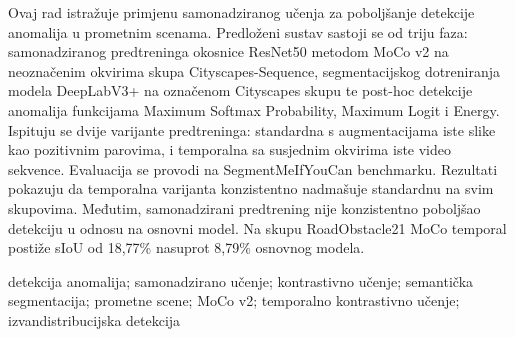 \documentclass[diplomskirad]{fer}
\begin{document}






\begin{sazetak}
	Ovaj rad istražuje primjenu samonadziranog učenja za poboljšanje detekcije anomalija u prometnim scenama. Predloženi sustav sastoji se od triju faza: samonadziranog predtreninga okosnice ResNet50 metodom MoCo v2 na neoznačenim okvirima skupa Cityscapes-Sequence, segmentacijskog dotreniranja modela DeepLabV3+ na označenom Cityscapes skupu te post-hoc detekcije anomalija funkcijama Maximum Softmax Probability, Maximum Logit i Energy. Ispituju se dvije varijante predtreninga: standardna s augmentacijama iste slike kao pozitivnim parovima, i temporalna sa susjednim okvirima iste video sekvence. Evaluacija se provodi na SegmentMeIfYouCan benchmarku. Rezultati pokazuju da temporalna varijanta konzistentno nadmašuje standardnu na svim skupovima. Međutim, samonadzirani predtrening nije konzistentno poboljšao detekciju u odnosu na osnovni model. Na skupu RoadObstacle21 MoCo temporal postiže sIoU od 18,77\% nasuprot 8,79\% osnovnog modela.
\end{sazetak}

\begin{kljucnerijeci}
	detekcija anomalija; samonadzirano učenje; kontrastivno učenje; semantička segmentacija; prometne scene; MoCo v2; temporalno kontrastivno učenje; izvandistribucijska detekcija
\end{kljucnerijeci}


\begin{abstract}
	The thesis investigates the application of self-supervised learning for improving anomaly detection in traffic scenes. The proposed system consists of three phases: self-supervised pretraining of a ResNet50 backbone using MoCo v2 on unlabeled frames from the Cityscapes-Sequence dataset, supervised fine-tuning of a DeepLabV3+ model on the annotated Cityscapes dataset, and post-hoc anomaly detection using Maximum Softmax Probability, Maximum Logit, and Energy scoring functions. Two pretraining variants are evaluated: a standard variant using augmentations of the same image as positive pairs, and a temporal variant using adjacent frames from the same video sequence. Evaluation is conducted on the SegmentMeIfYouCan benchmark. Results show that the temporal variant consistently outperforms the standard variant across all evaluated datasets. However, self-supervised pretraining did not consistently improve anomaly detection compared to the baseline model. On the RoadObstacle21 subset, MoCo temporal achieves an sIoU of 18.77\% compared to 8.79\% for the baseline model.
\end{abstract}
\end{document}
